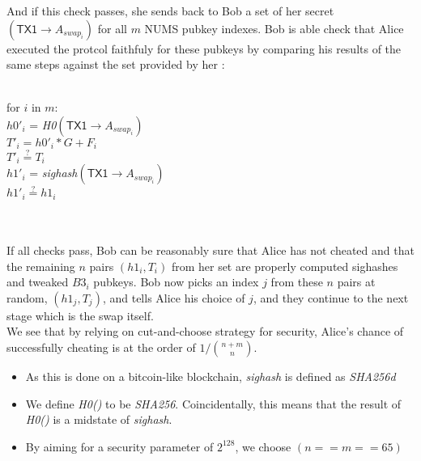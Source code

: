 \documentclass[12pt,a4paper]{article}
\begin{document}
And if this check passes, she sends back to Bob a set of her secret $(\textsf{TX1} \rightarrow A_{swap_i})$ for all $m$ NUMS pubkey indexes.  
Bob is able check that Alice executed the protcol faithfuly for these pubkeys by comparing his results of the same steps against the set provided by her : \\ \\
\begin{footnotesize}
for $i$ in $m$: \\
    \indent $h0'_i$ = \emph{H0}$(\textsf{TX1} \rightarrow A_{swap_i})$ \\
    \indent $T'_i = h0'_i*G + F_i$ \\
    \indent $T'_i \stackrel{?}{=} T_i$ \\
    \indent $h1'_i$ = \emph{sighash}$(\textsf{TX1} \rightarrow A_{swap_i})$ \\
    \indent $h1'_i \stackrel{?}{=} h1_i$ \\
\end{footnotesize} \\ \\
If all checks pass, Bob can be reasonably sure that Alice has not cheated and that the remaining $n$ pairs $(h1_i, T_i)$ from her set are properly computed sighashes and tweaked $B3_i$ pubkeys.  Bob now picks an index $j$ from these $n$ pairs at random, $(h1_j, T_j)$, and tells Alice his choice of $j$, and they continue to the next stage which is the swap itself. \\
We see that by relying on cut-and-choose strategy for security, Alice's chance of successfully cheating is at the order of $1/\binom{n+m}{n}$.
\begin{tiny}
\begin{itemize}
\item As this is done on a bitcoin-like blockchain, \emph{sighash} is defined as \emph{SHA256d}
\item We define \emph{H0()} to be \emph{SHA256}.  Coincidentally, this means that the result of  \emph{H0()} is a midstate of \emph{sighash}.
\item By aiming for a security parameter of $2^{128}$, we choose $(n == m == 65)$
\end{itemize}
\end{tiny}
\newpage
\end{document}
